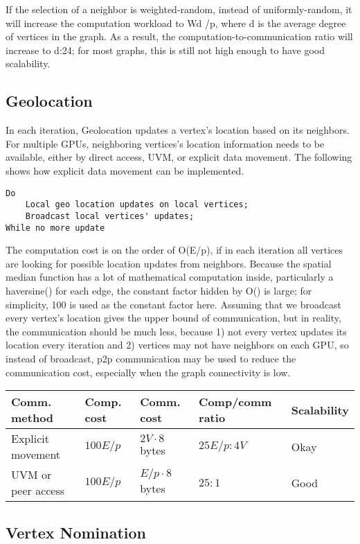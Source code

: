 \documentclass[10pt,oneside]{memoir}
\begin{document}
If the selection of a neighbor is weighted-random, instead of
uniformly-random, it will increase the computation workload to Wd /p,
where d is the average degree of vertices in the graph. As a result, the
computation-to-communication ratio will increase to d:24; for most
graphs, this is still not high enough to have good scalability.

\hypertarget{geolocation-2}{%
\subsection{Geolocation}\label{geolocation-2}}

In each iteration, Geolocation updates a vertex's location based on its
neighbors. For multiple GPUs, neighboring vertices's location
information needs to be available, either by direct access, UVM, or
explicit data movement. The following shows how explicit data movement
can be implemented.

\begin{verbatim}
Do
    Local geo location updates on local vertices;
    Broadcast local vertices' updates;
While no more update
\end{verbatim}

The computation cost is on the order of O(\textbar{}E\textbar{}/p), if
in each iteration all vertices are looking for possible location updates
from neighbors. Because the spatial median function has a lot of
mathematical computation inside, particularly a haversine() for each
edge, the constant factor hidden by O() is large; for simplicity, 100 is
used as the constant factor here. Assuming that we broadcast every
vertex's location gives the upper bound of communication, but in
reality, the communication should be much less, because 1) not every
vertex updates its location every iteration and 2) vertices may not have
neighbors on each GPU, so instead of broadcast, p2p communication may be
used to reduce the communication cost, especially when the graph
connectivity is low.

\begin{longtable}[]{@{}lllll@{}}
\toprule
Comm. method & Comp. cost & Comm. cost & Comp/comm ratio &
Scalability\tabularnewline
\midrule
\endhead
Explicit movement & \(100E/p\) & \(2V \cdot 8\) bytes & \(25E/p : 4V\) &
Okay\tabularnewline
UVM or peer access & \(100E/p\) & \(E/p \cdot 8\) bytes & \(25 : 1\) &
Good\tabularnewline
\bottomrule
\end{longtable}

\hypertarget{vertex-nomination-2}{%
\subsection{Vertex Nomination}\label{vertex-nomination-2}}
\end{document}
